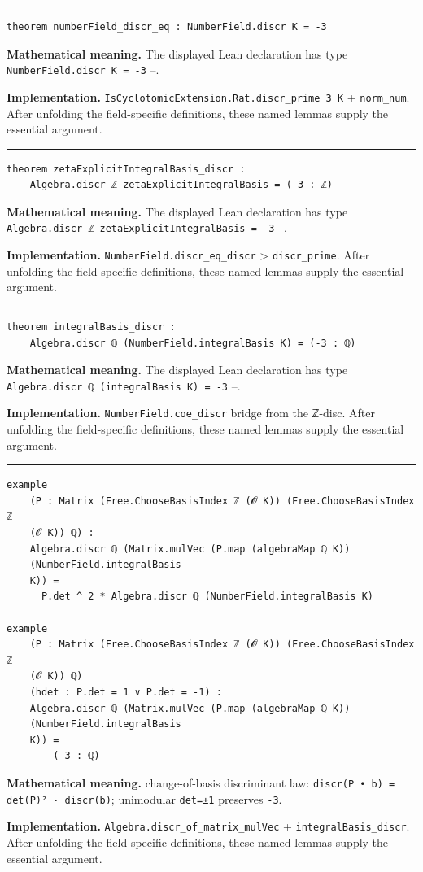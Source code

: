 \documentclass[UTF8,a4paper,11pt,fontset=fandol]{ctexart}
\theoremstyle{definition}
\newcommand{\statementsep}{\par\medskip\hrule\medskip}
\begin{document}
\statementsep
\begin{verbatim}
theorem numberField_discr_eq : NumberField.discr K = -3
\end{verbatim}
\noindent\textbf{Mathematical meaning.} The displayed Lean declaration has type \texttt{NumberField.\allowbreak{}discr K = -3} --.\par
\noindent\textbf{Implementation.} \texttt{IsCyclotomicExtension.\allowbreak{}Rat.\allowbreak{}discr\_\allowbreak{}prime 3 K} + \texttt{norm\_\allowbreak{}num}. After unfolding the field-specific definitions, these named lemmas supply the essential argument.\par
\statementsep
\begin{verbatim}
theorem zetaExplicitIntegralBasis_discr :
    Algebra.discr ℤ zetaExplicitIntegralBasis = (-3 : ℤ)
\end{verbatim}
\noindent\textbf{Mathematical meaning.} The displayed Lean declaration has type \texttt{Algebra.\allowbreak{}discr ℤ zetaExplicitIntegralBasis = -3} --.\par
\noindent\textbf{Implementation.} \texttt{NumberField.\allowbreak{}discr\_\allowbreak{}eq\_\allowbreak{}discr} > \texttt{discr\_\allowbreak{}prime}. After unfolding the field-specific definitions, these named lemmas supply the essential argument.\par
\statementsep
\begin{verbatim}
theorem integralBasis_discr :
    Algebra.discr ℚ (NumberField.integralBasis K) = (-3 : ℚ)
\end{verbatim}
\noindent\textbf{Mathematical meaning.} The displayed Lean declaration has type \texttt{Algebra.\allowbreak{}discr ℚ (integralBasis K) = -3} --.\par
\noindent\textbf{Implementation.} \texttt{NumberField.\allowbreak{}coe\_\allowbreak{}discr} bridge from the ℤ-disc. After unfolding the field-specific definitions, these named lemmas supply the essential argument.\par
\statementsep
\begin{verbatim}
example
    (P : Matrix (Free.ChooseBasisIndex ℤ (𝓞 K)) (Free.ChooseBasisIndex ℤ
    (𝓞 K)) ℚ) :
    Algebra.discr ℚ (Matrix.mulVec (P.map (algebraMap ℚ K))
    (NumberField.integralBasis
    K)) =
      P.det ^ 2 * Algebra.discr ℚ (NumberField.integralBasis K)

example
    (P : Matrix (Free.ChooseBasisIndex ℤ (𝓞 K)) (Free.ChooseBasisIndex ℤ
    (𝓞 K)) ℚ)
    (hdet : P.det = 1 ∨ P.det = -1) :
    Algebra.discr ℚ (Matrix.mulVec (P.map (algebraMap ℚ K))
    (NumberField.integralBasis
    K)) =
        (-3 : ℚ)
\end{verbatim}
\noindent\textbf{Mathematical meaning.} change-of-basis discriminant law: \texttt{discr(P • b) = det(P)² · discr(b)}; unimodular \texttt{det=±1} preserves \texttt{-3}.\par
\noindent\textbf{Implementation.} \texttt{Algebra.\allowbreak{}discr\_\allowbreak{}of\_\allowbreak{}matrix\_\allowbreak{}mulVec} + \texttt{integralBasis\_\allowbreak{}discr}. After unfolding the field-specific definitions, these named lemmas supply the essential argument.\par
\end{document}

